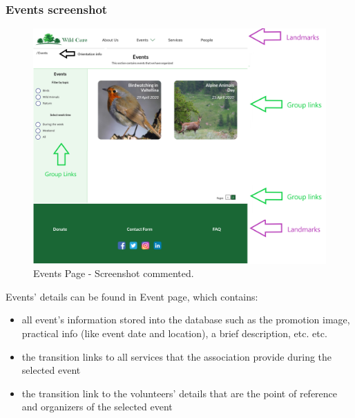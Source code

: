 \subsubsection{Events screenshot}
\begin{figure}[h!]
	\centering
	\begin{minipage}[b]{1\textwidth}
    		\includegraphics[width=\textwidth]{./assets/mockups/events_commented.png}
		\caption{Events Page - Screenshot commented.}
	\end{minipage}
\end{figure}
\FloatBarrier

\vspace{1cm}
\hspace{-1cm}
Events' details can be found in Event page, which contains:
\begin{itemize}
	\item all event's information stored into the database such as the promotion image, practical info (like event date and location),  			a brief description, etc. etc.
	\item the transition links to all services that the association provide during the selected event
	\item the transition link to the volunteers' details that are the point of reference and organizers of the selected event
\end{itemize} 

\clearpage

